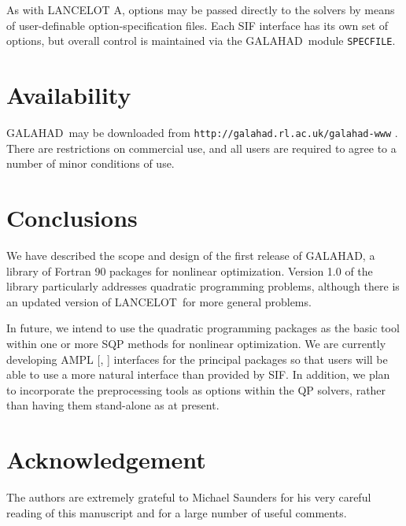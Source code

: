 \documentclass[acmtocl,acmnow]{acmtrans2m}
\newcommand{\gal}{{\sf GALAHAD}}
\newcommand{\lan}{{\sf LANCELOT}}
\newcommand{\lana}{{\sf LANCELOT A}}
\newcommand{\resetcounters}{\setcounter{equation}{0} \setcounter{figure}{0}
 \setcounter{table}{0}}
\newcommand{\lsection}[1]{\section{#1} \resetcounters \label{#1}}
\newcommand{\bciteb}[1]{\citeauthor{#1}, \citeyear{#1}}
\begin{document}
As with \lana, options may be passed directly to the solvers by means of
user-definable option-specification files. Each SIF interface
has its own set of options, but overall control is maintained via
the \gal\ module {\tt SPECFILE}.

\lsection{Availability}

\gal\ may be downloaded from
{\tt http://galahad.rl.ac.uk/galahad-www} .
There are restrictions on commercial use, and all users are required to
agree to a number of minor conditions of use.

\lsection{Conclusions}

We have described the scope and design of the first release of \gal,
a library of Fortran 90 packages for nonlinear optimization.
Version 1.0 of the library particularly addresses quadratic programming
problems, although there is an updated version of \lan\ for more general
problems.

In future, we intend to use the quadratic programming packages as the
basic tool within one or more SQP methods for nonlinear optimization.
We are currently developing AMPL [\bciteb{FourGayKern93}] interfaces
for the principal packages so that users will be able to use a more
natural interface than provided by SIF. In addition, we plan to incorporate
the preprocessing tools as options within the QP solvers, rather than having
them stand-alone as at present.

\section*{Acknowledgement}

The authors are extremely grateful to Michael Saunders for his very
careful reading of this manuscript and for a large number of useful comments.

\end{document}
